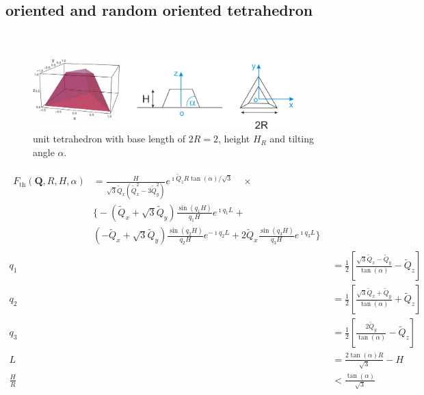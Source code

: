 \subsection{oriented and random oriented tetrahedron} ~\\
\cite{Renaud2009}
\begin{figure}[htb]
\begin{center}
\includegraphics[width=0.9\textwidth]{../images/form_factor/oriented_primitive_opbjects/tetrahedron.png}
\end{center}
\caption{unit tetrahedron with base length of $2R=2$, height $H_R$ and tilting angle $\alpha$.}
\label{fig:opo_tetrahedron}
\end{figure}


\begin{align}\label{eq:opo_tetrah}
\begin{split}
 F_\mathrm{th}(\mathbf{Q},R,H,\alpha) & = \frac{H}{\sqrt{3}\tilde{Q}_x\left(\tilde{Q}_x^2-3\tilde{Q}_y^2\right)} e^{\imath\tilde{Q}_zR\tan(\alpha)/\sqrt{3}} \quad \times\\
     &  \Bigg\{-\left(\tilde{Q}_x+\sqrt{3}\tilde{Q}_y\right) \frac{\sin(q_1H)}{q_1H}e^{\imath q_1L}  +\\
     & \left(-\tilde{Q}_x+\sqrt{3}\tilde{Q}_y\right)\frac{\sin(q_2H)}{q_2H}e^{-\imath q_2L} +2\tilde{Q}_x \frac{\sin(q_3H)}{q_3H}e^{\imath q_3L}\Bigg\}
\end{split} \\
  q_1 & =\frac12 \left[\frac{\sqrt{3}\tilde{Q}_x-\tilde{Q}_y}{\tan(\alpha)}-\tilde{Q}_z\right]\\
  q_2 & =\frac12 \left[\frac{\sqrt{3}\tilde{Q}_x+\tilde{Q}_y}{\tan(\alpha)}+\tilde{Q}_z\right]\\
  q_3 & =\frac12 \left[\frac{2\tilde{Q}_y}{\tan(\alpha)}-\tilde{Q}_z\right]\\
  L & =\frac{2\tan(\alpha)R}{\sqrt{3}}-H\\
  \frac{H}{R} & < \frac{\tan(\alpha)}{\sqrt{3}}
\end{align}

